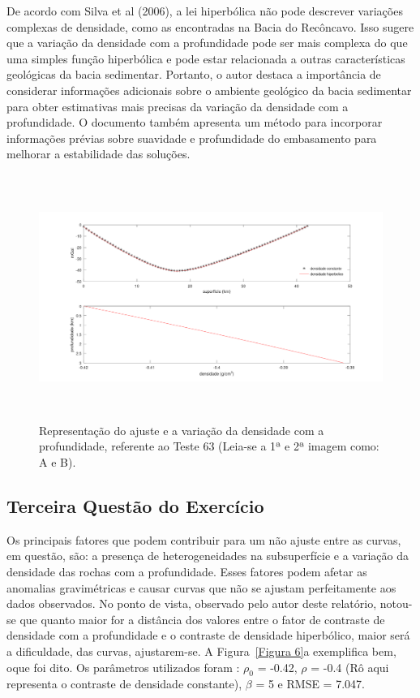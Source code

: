De acordo com Silva et al (2006), a lei hiperbólica não pode descrever variações complexas de densidade, como as encontradas na Bacia do Recôncavo. Isso sugere que a variação da densidade com a profundidade pode ser mais complexa do que uma simples função hiperbólica e pode estar relacionada a outras características geológicas da bacia sedimentar. Portanto, o autor destaca a importância de considerar informações adicionais sobre o ambiente geológico da bacia sedimentar para obter estimativas mais precisas da variação da densidade com a profundidade. O documento também apresenta um método para incorporar informações prévias sobre suavidade e profundidade do embasamento para melhorar a estabilidade das soluções.
         \begin{figure}[!h]  
                \centering
                \includegraphics[height=8cm]{figure/Imagens 1a questao/teste63.png}
                \caption{Representação do ajuste e a variação da densidade com a profundidade, referente ao Teste 63 (Leia-se a 1ª e 2ª imagem como: A e B).}
                \label{Figura 5}
            \end{figure}


\subsection{Terceira Questão do Exercício}

Os principais fatores que podem contribuir para um não ajuste entre as curvas, em questão, são: a presença de heterogeneidades na subsuperfície e a variação da densidade das rochas com a profundidade. Esses fatores podem afetar as anomalias gravimétricas e causar curvas que não se ajustam perfeitamente aos dados observados. No ponto de vista, observado pelo autor deste relatório, notou-se que quanto maior for a distância dos valores entre o fator de contraste de densidade com a profundidade e o contraste de densidade hiperbólico, maior será a dificuldade, das curvas, ajustarem-se. A Figura~\ref{Figura 6}a exemplifica bem, oque foi dito. Os parâmetros utilizados foram : $\rho_0$ = -0.42, $\rho$ = -0.4 (Rô aqui representa o contraste de densidade constante), $\beta$ = 5 e RMSE = 7.047.

